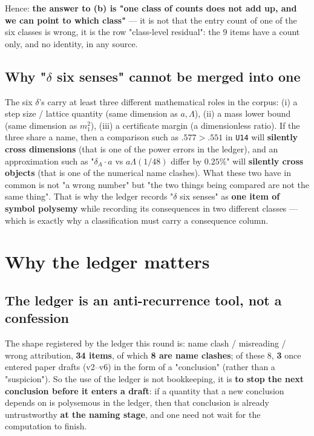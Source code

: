 \documentclass[11pt,a4paper]{article}
\begin{document}
\noindent Hence: \textbf{the answer to (b) is "one class of counts does not add up, and we can point to which class"} --- it is not that the entry count of one of the six classes is wrong, it is the row "class-level residual": the $9$ items have a count only, and no identity, in any source.

\subsection{Why "$\delta$ six senses" cannot be merged into one}

The six $\delta$'s carry at least three different mathematical roles in the corpus: (i) a step size / lattice quantity (same dimension as $a,\Lambda$), (ii) a mass lower bound (same dimension as $m_1^2$), (iii) a certificate margin (a dimensionless ratio). If the three share a name, then a comparison such as $.577>.551$ in \texttt{U14} will \textbf{silently cross dimensions} (that is one of the power errors in the ledger), and an approximation such as "$\delta_A\cdot a$ vs $a\Lambda(1/48)$ differ by $0.25\%$" will \textbf{silently cross objects} (that is one of the numerical name clashes). What these two have in common is not "a wrong number" but "the two things being compared are not the same thing". That is why the ledger records "$\delta$ six senses" as \textbf{one item of symbol polysemy} while recording its consequences in two different classes --- which is exactly why a classification must carry a consequence column.

\section{Why the ledger matters}

\subsection{The ledger is an anti-recurrence tool, not a confession}

The shape registered by the ledger this round is: name clash / misreading / wrong attribution, \textbf{34 items}, of which \textbf{8 are name clashes}; of these $8$, \textbf{3} once entered paper drafts (v2--v6) in the form of a "conclusion" (rather than a "suspicion"). So the use of the ledger is not bookkeeping, it is \textbf{to stop the next conclusion before it enters a draft}: if a quantity that a new conclusion depends on is polysemous in the ledger, then that conclusion is already untrustworthy \textbf{at the naming stage}, and one need not wait for the computation to finish.
\end{document}
